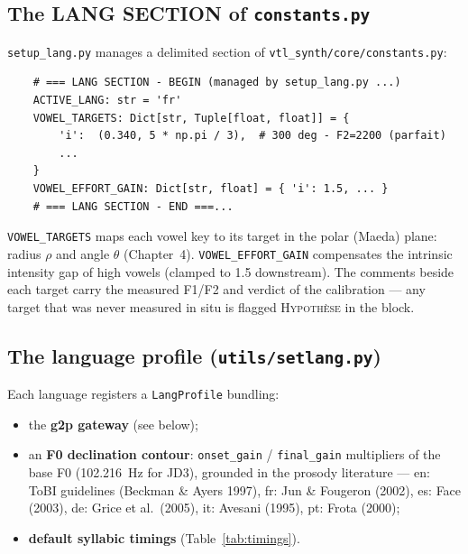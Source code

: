\documentclass[11pt,a4paper]{article}
\newcommand{\code}[1]{\texttt{#1}}
\begin{document}
\subsection{The LANG SECTION of \code{constants.py}}

\code{setup\_lang.py} manages a delimited section of
\code{vtl\_synth/core/constants.py}:

\begin{verbatim}
    # === LANG SECTION - BEGIN (managed by setup_lang.py ...)
    ACTIVE_LANG: str = 'fr'
    VOWEL_TARGETS: Dict[str, Tuple[float, float]] = {
        'i':  (0.340, 5 * np.pi / 3),  # 300 deg - F2=2200 (parfait)
        ...
    }
    VOWEL_EFFORT_GAIN: Dict[str, float] = { 'i': 1.5, ... }
    # === LANG SECTION - END ===...
\end{verbatim}

\code{VOWEL\_TARGETS} maps each vowel key to its target in the polar
(Maeda) plane: radius $\rho$ and angle $\theta$ (Chapter~4).
\code{VOWEL\_EFFORT\_GAIN} compensates the intrinsic intensity gap of
high vowels (clamped to 1.5 downstream). The comments beside each
target carry the measured F1/F2 and verdict of the calibration ---
any target that was never measured in situ is flagged
\textsc{Hypoth\`ese} in the block.

\subsection{The language profile (\code{utils/setlang.py})}

Each language registers a \code{LangProfile} bundling:

\begin{itemize}
\item the \textbf{g2p gateway} (see below);
\item an \textbf{F0 declination contour}: \code{onset\_gain} /
      \code{final\_gain} multipliers of the base F0 (102.216~Hz for
      JD3), grounded in the prosody literature --- en: ToBI
      guidelines (Beckman \& Ayers 1997), fr: Jun \& Fougeron (2002),
      es: Face (2003), de: Grice et al.\ (2005), it: Avesani (1995),
      pt: Frota (2000);
\item \textbf{default syllabic timings} (Table~\ref{tab:timings}).
\end{itemize}
\end{document}
